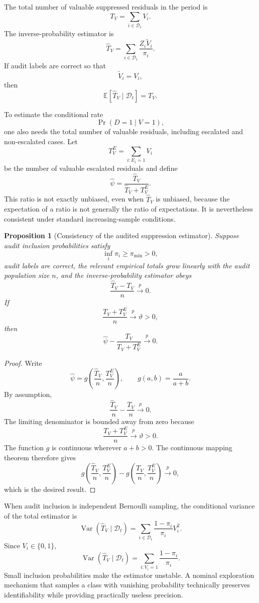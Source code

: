 \documentclass[11pt]{article}
\newtheorem{proposition}[definition]{Proposition}
\theoremstyle{definition}
\DeclareMathOperator{\Var}{Var}
\DeclareMathOperator{\Prob}{Pr}
\newcommand{\E}{\mathbb{E}}
\begin{document}
The total number of valuable suppressed residuals in the period is
\[
T_V
=
\sum_{i\in\mathcal{D}_t}V_i.
\]
The inverse-probability estimator is
\[
\widehat{T}_V
=
\sum_{i\in\mathcal{D}_t}
\frac{Z_i\widetilde{V}_i}{\pi_i}.
\]
If audit labels are correct so that
\[
\widetilde{V}_i=V_i,
\]
then
\[
\E[\widehat{T}_V\mid\mathcal{D}_t]
=
T_V.
\]

To estimate the conditional rate
\[
\Prob(D=1\mid V=1),
\]
one also needs the total number of valuable residuals, including escalated and non-escalated cases. Let
\[
T_V^{E}
=
\sum_{i:E_i=1}V_i
\]
be the number of valuable escalated residuals and define
\[
\widehat{\psi}
=
\frac{
\widehat{T}_V
}{
\widehat{T}_V+T_V^{E}
}.
\]
This ratio is not exactly unbiased, even when \(\widehat{T}_V\) is unbiased, because the expectation of a ratio is not generally the ratio of expectations. It is nevertheless consistent under standard increasing-sample conditions.

\begin{proposition}[Consistency of the audited suppression estimator]
Suppose audit inclusion probabilities satisfy
\[
\inf_i\pi_i\geq\pi_{\min}>0,
\]
audit labels are correct, the relevant empirical totals grow linearly with the audit population size \(n\), and the inverse-probability estimator obeys
\[
\frac{\widehat{T}_V-T_V}{n}
\xrightarrow{p}
0.
\]
If
\[
\frac{T_V+T_V^{E}}{n}
\xrightarrow{p}
\vartheta>0,
\]
then
\[
\widehat{\psi}
-
\frac{T_V}{T_V+T_V^{E}}
\xrightarrow{p}
0.
\]
\end{proposition}

\begin{proof}
Write
\[
\widehat{\psi}
=
g\!\left(
\frac{\widehat{T}_V}{n},
\frac{T_V^{E}}{n}
\right),
\qquad
g(a,b)=\frac{a}{a+b}.
\]
By assumption,
\[
\frac{\widehat{T}_V}{n}
-
\frac{T_V}{n}
\xrightarrow{p}0.
\]
The limiting denominator is bounded away from zero because
\[
\frac{T_V+T_V^{E}}{n}
\xrightarrow{p}\vartheta>0.
\]
The function \(g\) is continuous wherever \(a+b>0\). The continuous mapping theorem therefore gives
\[
g\!\left(
\frac{\widehat{T}_V}{n},
\frac{T_V^{E}}{n}
\right)
-
g\!\left(
\frac{T_V}{n},
\frac{T_V^{E}}{n}
\right)
\xrightarrow{p}0,
\]
which is the desired result.
\end{proof}

When audit inclusion is independent Bernoulli sampling, the conditional variance of the total estimator is
\[
\Var(\widehat{T}_V\mid\mathcal{D}_t)
=
\sum_{i\in\mathcal{D}_t}
\frac{1-\pi_i}{\pi_i}V_i^2.
\]
Since \(V_i\in\{0,1\}\),
\[
\Var(\widehat{T}_V\mid\mathcal{D}_t)
=
\sum_{i:V_i=1}
\frac{1-\pi_i}{\pi_i}.
\]
Small inclusion probabilities make the estimator unstable. A nominal exploration mechanism that samples a class with vanishing probability technically preserves identifiability while providing practically useless precision.
\end{document}
